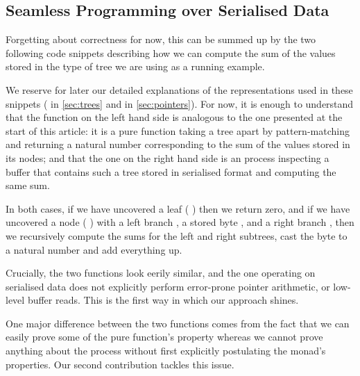 \subsection{Seamless Programming over Serialised Data}

Forgetting about correctness for now, this can be summed up by the
two following code snippets describing how we can compute the sum
of the values stored in the type of tree we are using as a running
example.

\noindent
\begin{minipage}{.4\textwidth}
\end{minipage}
\hfill\begin{minipage}{.55\textwidth}
\end{minipage}

We reserve for later our detailed explanations of the representations
used in these snippets
( in \cref{sec:trees} and
 in \cref{sec:pointers}).
%
For now, it is enough to understand that the function on the left hand
side is analogous to the one presented at the start of this article: it
is a pure function taking a tree apart by pattern-matching and returning
a natural number corresponding to the sum of the values stored in its nodes;
%
and that the one on the right hand side is an  process
inspecting a buffer that contains such a tree stored in serialised format
and computing the same sum.

In both cases, if we have uncovered a leaf
({ \IdrisData{\#}} \IdrisKeyword{\KatlaUnderscore{}})
then we return zero,
and if we have uncovered a node
({ \IdrisData{\#}}  \IdrisData{\#}  \IdrisData{\#} )
with
a left branch ,
a stored byte ,
and a right branch ,
then we recursively compute the sums for the left and right subtrees,
cast the byte to a natural number and add everything up.

Crucially, the two functions look eerily similar, and the one operating on
serialised data does not explicitly perform error-prone pointer arithmetic,
or low-level buffer reads.
%
This is the first way in which our approach shines.

One major difference between the two functions comes from the fact that
we can easily prove some of the pure function's property whereas we
cannot prove anything about the  process without first
explicitly postulating the  monad's properties.
%
Our second contribution tackles this issue.

